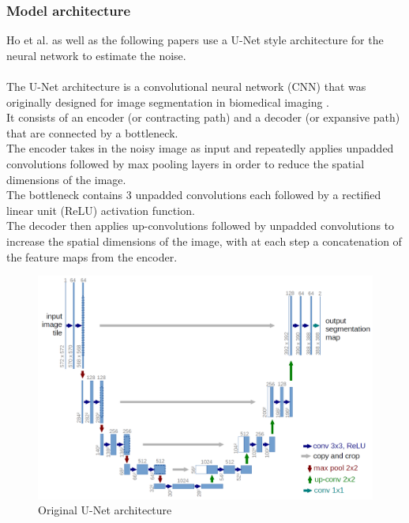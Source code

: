 \documentclass{article}
\begin{document}
\subsubsection{Model architecture}
Ho et al. \cite{ho2020denoising} as well as the following papers use a U-Net style architecture for the neural network to estimate the noise.
\\\\
The U-Net architecture is a convolutional neural network (CNN) that was originally designed for image segmentation in biomedical imaging \cite{ronneberger2015unet}. \\
It consists of an encoder (or contracting path) and a decoder (or expansive path) that are connected by a bottleneck. \\
The encoder takes in the noisy image as input and repeatedly applies unpadded convolutions followed by max pooling layers in order to reduce the spatial dimensions of the image. \cite{ronneberger2015unet} \\
The bottleneck contains 3 unpadded convolutions each followed by a rectified linear unit (ReLU) activation function. \cite{ronneberger2015unet} \\
The decoder then applies up-convolutions followed by unpadded convolutions to increase the spatial dimensions of the image, with at each step a concatenation of the feature maps from the encoder. \cite{ronneberger2015unet}
\begin{figure}[h]
  \includegraphics[width=\textwidth]{images/unet.png}
  \caption{Original U-Net architecture \cite{ronneberger2015unet}}
\end{figure}
\\\\
\end{document}
